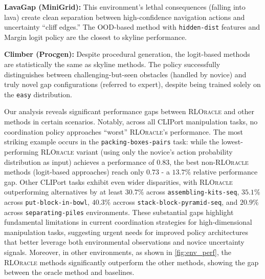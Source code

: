 \textbf{LavaGap (MiniGrid):} This environment's lethal consequences (falling into lava) create clean separation between high-confidence navigation actions and uncertainty ``cliff edges.'' The OOD-based method with \texttt{hidden-dist} features and Margin logit policy are the closest to skyline performance.

\textbf{Climber (Procgen):} Despite procedural generation, the logit-based methods are statistically the same as skyline methods. The policy successfully distinguishes between challenging-but-seen obstacles (handled by novice) and truly novel gap configurations (referred to expert), despite being trained solely on the \texttt{easy} distribution.

Our analysis reveals significant performance gaps between \textsc{RLOracle} and other methods in certain scenarios. Notably, across all CLIPort manipulation tasks, no coordination policy approaches ``worst'' \textsc{RLOracle}'s performance. The most striking example occurs in the \texttt{packing-boxes-pairs} task: while the lowest-performing \textsc{RLOracle} variant (using only the novice's action probability distribution as input) achieves a performance of $0.83$, the best non-\textsc{RLOracle} methods (logit-based approaches) reach only $0.73$ - a $13.7\%$ relative performance gap. Other CLIPort tasks exhibit even wider disparities, with \textsc{RLOracle} outperforming alternatives by at least $30.7\%$ across \texttt{assembling-kits-seq}, $35.1\%$ across \texttt{put-block-in-bowl}, $40.3\%$ accross \texttt{stack-block-pyramid-seq}, and $20.9\%$ across \texttt{separating-piles} environments. These substantial gaps highlight fundamental limitations in current coordination strategies for high-dimensional manipulation tasks, suggesting urgent needs for improved policy architectures that better leverage both environmental observations and novice uncertainty signals. 
Moreover, in other environments, as shown in \autoref{fig:env_perf}, the \textsc{RLOracle} methods significantly outperform the other methods, showing the gap between the oracle method and baselines.